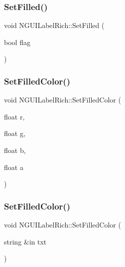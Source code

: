 \subsubsection{\texorpdfstring{Set\+Filled()}{SetFilled()}}
{\footnotesize\ttfamily void N\+G\+U\+I\+Label\+Rich\+::\+Set\+Filled (\begin{DoxyParamCaption}\item[{bool}]{flag }\end{DoxyParamCaption})}

\hypertarget{class_n_g_u_i_label_rich_a598776b12528d3c1f26fe6d492295f2a}{}\label{class_n_g_u_i_label_rich_a598776b12528d3c1f26fe6d492295f2a} 
\subsubsection{\texorpdfstring{Set\+Filled\+Color()}{SetFilledColor()}\hspace{0.1cm}{\footnotesize\ttfamily [1/2]}}
{\footnotesize\ttfamily void N\+G\+U\+I\+Label\+Rich\+::\+Set\+Filled\+Color (\begin{DoxyParamCaption}\item[{float}]{r,  }\item[{float}]{g,  }\item[{float}]{b,  }\item[{float}]{a }\end{DoxyParamCaption})}

\hypertarget{class_n_g_u_i_label_rich_ab9bd5410fcccdd234106484b488d2fc7}{}\label{class_n_g_u_i_label_rich_ab9bd5410fcccdd234106484b488d2fc7} 
\subsubsection{\texorpdfstring{Set\+Filled\+Color()}{SetFilledColor()}\hspace{0.1cm}{\footnotesize\ttfamily [2/2]}}
{\footnotesize\ttfamily void N\+G\+U\+I\+Label\+Rich\+::\+Set\+Filled\+Color (\begin{DoxyParamCaption}\item[{string \&in}]{txt }\end{DoxyParamCaption})}

